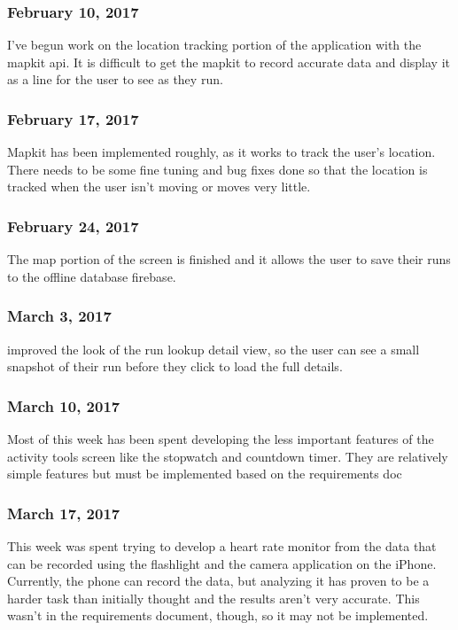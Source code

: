\subsubsection{February 10, 2017}\label{section}
I've begun work on the location tracking portion of the application with the mapkit api. It is difficult to get the mapkit to record accurate data and display it as a line for the user to see as they run.
\subsubsection{February 17, 2017}\label{section}
Mapkit has been implemented roughly, as it works to track the user's location. There needs to be some fine tuning and bug fixes done so that the location is tracked when the user isn't moving or moves very little.

\subsubsection{February 24, 2017}\label{section}
The map portion of the screen is finished and it allows the user to save their runs to the offline database firebase.

\subsubsection{March 3, 2017}\label{section}
improved the look of the run lookup detail view, so the user can see a small snapshot of their run before they click to load the full details.

\subsubsection{March 10, 2017}\label{section}
Most of this week has been spent developing the less important features of the activity tools screen like the stopwatch and countdown timer. They are relatively simple features but must be implemented based on the requirements doc

\subsubsection{March 17, 2017}\label{section}
This week was spent trying to develop a heart rate monitor from the data that can be recorded using the flashlight and the camera application on the iPhone. Currently, the phone can record the data, but analyzing it has proven to be a harder task than initially thought and the results aren't very accurate. This wasn't in the requirements document, though, so it may not be implemented.

